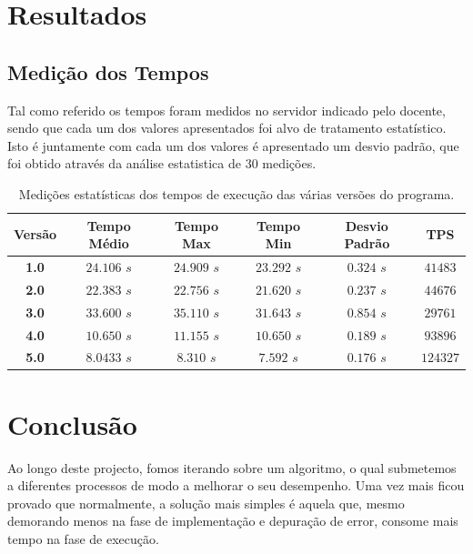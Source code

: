 \documentclass[a4paper]{article}
\begin{document}
\section{Resultados}
\subsection{Medição dos Tempos}
\indent \indent Tal como referido os tempos foram medidos no servidor indicado pelo docente, sendo que cada um dos valores apresentados foi alvo de tratamento estatístico. Isto é juntamente com cada um dos valores é apresentado um desvio padrão, que foi obtido através da análise estatistica de 30 medições.

\begin{table}[H]
	\begin{tabular}{| c | c | c | c | c | c |} \hline
		\textbf{Versão}	&	\textbf{Tempo Médio}	&	\textbf{Tempo Max}	&	\textbf{Tempo Min}	&	\textbf{Desvio Padrão}	&	\textbf{TPS}		\\	\hline
		\textbf{1.0}	&		$24.106$ $s$		&		$24.909$ $s$		&		$23.292$ $s$		&		$0.324$ $s$			&	$41483$		\\	\hline
		\textbf{2.0}	&		$22.383$ $s$		&		$22.756$ $s$		&		$21.620$ $s$		&		$0.237$ $s$			&	$44676$		\\	\hline
		\textbf{3.0}	&		$33.600$ $s$		&		$35.110$ $s$		&		$31.643$ $s$		&		$0.854$ $s$			&	$29761$		\\	\hline
		\textbf{4.0}	&		$10.650$ $s$		&		$11.155$ $s$		&		$10.650$ $s$		&		$0.189$ $s$			&	$93896$		\\	\hline
		\textbf{5.0}	&		$8.0433$ $s$		&		$8.310$ $s$			&		$7.592$ $s$			&		$0.176$ $s$			&	$124327$	\\	\hline
	\end{tabular}
	\caption{Medições estatísticas dos tempos de execução das várias versões do programa.}
\end{table}

\clearpage

\section{Conclusão}
\indent \indent Ao longo deste projecto, fomos iterando sobre um algoritmo, o qual submetemos a diferentes processos de modo a melhorar o seu desempenho. Uma vez mais ficou provado que normalmente, a solução mais simples é aquela que, mesmo demorando menos na fase de implementação e depuração de error, consome mais tempo na fase de execução.
\end{document}
